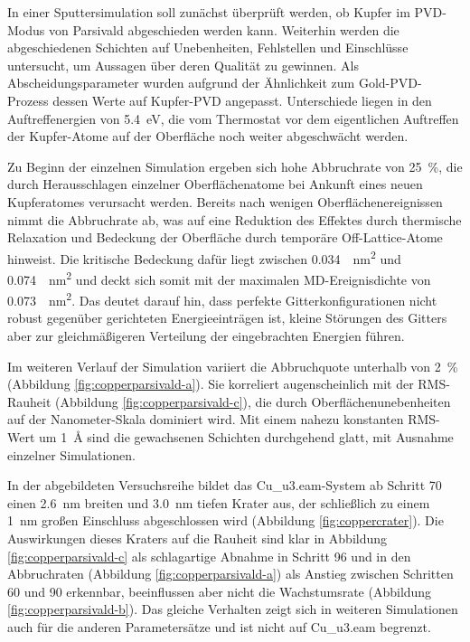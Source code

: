 In einer Sputtersimulation soll zunächst überprüft werden, ob Kupfer im PVD-Modus von Parsivald abgeschieden werden kann.
Weiterhin werden die abgeschiedenen Schichten auf Unebenheiten, Fehlstellen und Einschlüsse untersucht, um Aussagen über deren Qualität zu gewinnen.
Als Abscheidungsparameter wurden aufgrund der Ähnlichkeit zum Gold-PVD-Prozess dessen Werte auf Kupfer-PVD angepasst.
Unterschiede liegen in den Auftreffenergien von \SI{5.4}{\electronvolt}, die vom Thermostat vor dem eigentlichen Auftreffen der Kupfer-Atome auf der Oberfläche noch weiter abgeschwächt werden.

Zu Beginn der einzelnen Simulation ergeben sich hohe Abbruchrate von \SI{25}{\percent}, die durch Herausschlagen einzelner Oberflächenatome bei Ankunft eines neuen Kupferatomes verursacht werden.
Bereits nach wenigen Oberflächenereignissen nimmt die Abbruchrate ab, was auf eine Reduktion des Effektes durch thermische Relaxation und Bedeckung der Oberfläche durch temporäre Off-Lattice-Atome hinweist.
Die kritische Bedeckung dafür liegt zwischen \SI{0.034}{\per\nano\meter\squared} und \SI{0.074}{\per\nano\meter\squared} und deckt sich somit mit der maximalen MD-Ereignisdichte von \SI{0.073}{\per\nano\meter\squared}.
Das deutet darauf hin, dass perfekte Gitterkonfigurationen nicht robust gegenüber gerichteten Energieeinträgen ist, kleine Störungen des Gitters aber zur gleichmäßigeren Verteilung der eingebrachten Energien führen.

Im weiteren Verlauf der Simulation variiert die Abbruchquote unterhalb von \SI{2}{\percent} (Abbildung \ref{fig:copperparsivald-a}).
Sie korreliert augenscheinlich mit der RMS-Rauheit (Abbildung \ref{fig:copperparsivald-c}), die durch Oberflächenunebenheiten auf der Nanometer-Skala dominiert wird.
Mit einem nahezu konstanten RMS-Wert um \SI{1}{\angstrom} sind die gewachsenen Schichten durchgehend glatt, mit Ausnahme einzelner Simulationen.

In der abgebildeten Versuchsreihe bildet das Cu\_u3.eam-System ab Schritt 70 einen \SI{2.6}{\nano\meter} breiten und \SI{3.0}{\nano\meter} tiefen Krater aus, der schließlich zu einem \SI{1}{\nano\meter} großen Einschluss abgeschlossen wird (Abbildung \ref{fig:coppercrater}).
Die Auswirkungen dieses Kraters auf die Rauheit sind klar in Abbildung \ref{fig:copperparsivald-c} als schlagartige Abnahme in Schritt 96 und in den Abbruchraten (Abbildung \ref{fig:copperparsivald-a}) als Anstieg zwischen Schritten 60 und 90 erkennbar, beeinflussen aber nicht die Wachstumsrate (Abbildung \ref{fig:copperparsivald-b}).
Das gleiche Verhalten zeigt sich in weiteren Simulationen auch für die anderen Parametersätze und ist nicht auf Cu\_u3.eam begrenzt.

